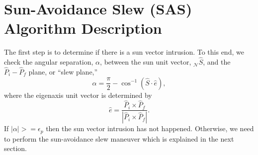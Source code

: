 \documentclass[journal ]{new-aiaa}
\begin{document}
\section{Sun-Avoidance Slew (SAS) Algorithm Description} 
	The first step is to determine if there is a sun vector intrusion. To this end, we check the angular separation, $\alpha$, between the sun unit vector, $_\mathcal{N}\hat{S}$, and the $\hat{P}_i-\hat{P}_f$ plane, or ``slew plane,''
		\begin{equation}
		\alpha=\frac{\pi}{2}-\cos^{-1}(\hat{S}\cdot\hat{e}),
		\end{equation}
		where the eigenaxis unit vector is determined by
		\begin{equation}\label{eaxis}
		\hat{e}=\frac{\hat{P}_i\times\hat{P}_f}{|\hat{P}_i\times \hat{P}_f|}.
		\end{equation} 
If $|\alpha|>=\epsilon_p$ then the sun vector intrusion has not happened. Otherwise, we need to perform the sun-avoidance slew maneuver which is explained in the next section.
	
	
	
\end{document}
